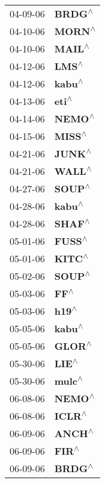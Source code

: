 \begin{supertabular}{p{0.08\textwidth}p{0.2\textwidth}}
 04-09-06 &    \textbf{BRDG\textsuperscript{$\wedge$}} \\
 04-10-06 &    \textbf{MORN\textsuperscript{$\wedge$}} \\
 04-10-06 &    \textbf{MAIL\textsuperscript{$\wedge$}} \\
 04-12-06 &     \textbf{LMS\textsuperscript{$\wedge$}} \\
 04-12-06 &    \textbf{kabu\textsuperscript{$\wedge$}} \\
 04-13-06 &     \textbf{eti\textsuperscript{$\wedge$}} \\
 04-14-06 &    \textbf{NEMO\textsuperscript{$\wedge$}} \\
 04-15-06 &    \textbf{MISS\textsuperscript{$\wedge$}} \\
 04-21-06 &    \textbf{JUNK\textsuperscript{$\wedge$}} \\
 04-21-06 &    \textbf{WALL\textsuperscript{$\wedge$}} \\
 04-27-06 &    \textbf{SOUP\textsuperscript{$\wedge$}} \\
 04-28-06 &    \textbf{kabu\textsuperscript{$\wedge$}} \\
 04-28-06 &    \textbf{SHAF\textsuperscript{$\wedge$}} \\
 05-01-06 &    \textbf{FUSS\textsuperscript{$\wedge$}} \\
 05-01-06 &    \textbf{KITC\textsuperscript{$\wedge$}} \\
 05-02-06 &    \textbf{SOUP\textsuperscript{$\wedge$}} \\
 05-03-06 &      \textbf{FF\textsuperscript{$\wedge$}} \\
 05-03-06 &     \textbf{h19\textsuperscript{$\wedge$}} \\
 05-05-06 &    \textbf{kabu\textsuperscript{$\wedge$}} \\
 05-05-06 &    \textbf{GLOR\textsuperscript{$\wedge$}} \\
 05-30-06 &     \textbf{LIE\textsuperscript{$\wedge$}} \\
 05-30-06 &    \textbf{mulc\textsuperscript{$\wedge$}} \\
 06-08-06 &    \textbf{NEMO\textsuperscript{$\wedge$}} \\
 06-08-06 &    \textbf{ICLR\textsuperscript{$\wedge$}} \\
 06-09-06 &    \textbf{ANCH\textsuperscript{$\wedge$}} \\
 06-09-06 &     \textbf{FIR\textsuperscript{$\wedge$}} \\
 06-09-06 &    \textbf{BRDG\textsuperscript{$\wedge$}} \\

\end{supertabular}
